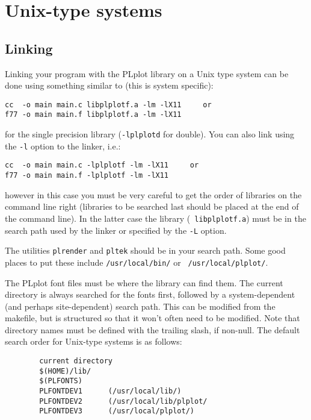 \section{Unix-type systems}
\label{sec:unix}


\subsection{Linking}

Linking your program with the PLplot library on a Unix type
system can be done using something similar to (this is system specific):
\begin{verbatim}
cc  -o main main.c libplplotf.a -lm -lX11     or
f77 -o main main.f libplplotf.a -lm -lX11
\end{verbatim}
for the single precision library ({\tt -lplplotd} for double).  
You can also link using the {\tt -l} option to the linker,
i.e.:
\begin{verbatim}
cc  -o main main.c -lplplotf -lm -lX11     or
f77 -o main main.f -lplplotf -lm -lX11
\end{verbatim}
however in this case you must be very careful to get the order of libraries
on the command line right (libraries to be searched last should be placed at
the end of the command line).  In the latter case the library ({\tt
libplplotf.a}) must be in the search path used by the linker or specified by
the {\tt -L} option.

The utilities {\tt plrender} and {\tt pltek} should be in your search path.
Some good places to put these include {\tt /usr/local/bin/} or {\tt
/usr/local/plplot/}.

The PLplot font files must be where the library can find them.
The current directory is always searched for the fonts first, followed
by a system-dependent (and perhaps site-dependent) search path.
This can be modified from the makefile, but is structured so that it won't
often need to be modified.  Note that directory names must be defined with
the trailing slash, if non-null.  The default search order for Unix-type
systems is as follows:
\begin{verbatim}
        current directory
        $(HOME)/lib/
        $(PLFONTS)
        PLFONTDEV1      (/usr/local/lib/)
        PLFONTDEV2      (/usr/local/lib/plplot/
        PLFONTDEV3      (/usr/local/plplot/)
\end{verbatim}

